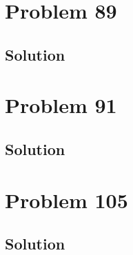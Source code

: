 \documentclass[12pt]{article}
\begin{document}
    \pagebreak
    \section{Problem 89}

        \subsection{Solution}

    \pagebreak
    \section{Problem 91}

        \subsection{Solution}

    \pagebreak
    \section{Problem 105}

        \subsection{Solution}

    \pagebreak
    \tableofcontents
\end{document}

